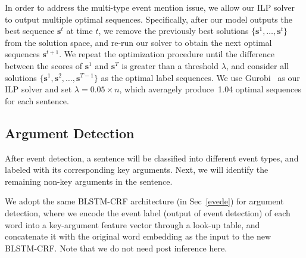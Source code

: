 In order to address the multi-type event mention issue, we allow our ILP solver to output multiple optimal sequences. 
Specifically, after our model outputs the best sequence $\bm{s}^t$ at time $t$, we remove the previously best solutions 
 $\{\bm{s}^1, \ldots, \bm{s}^{t}\}$ from the solution space, and re-run our solver to obtain the next optimal sequences $\bm{s}^{t+1}$. 
We repeat the optimization procedure until the difference between the scores of $\bm{s}^1$ and $\bm{s}^T$ is greater 
than a threshold $\lambda$, and consider all solutions $\{\bm{s}^1, \bm{s}^2, \ldots, \bm{s}^{T-1}\}$ as the optimal label sequences. 
We use Gurobi~\cite{gurobi} as our ILP solver and set $\lambda=0.05 \times n$, which averagely produce~1.04 optimal sequences for each sentence. 

\subsection{Argument Detection}
After event detection, a sentence will be classified into different event types, and labeled with its corresponding key arguments. 
Next, we will identify the remaining non-key arguments in the sentence. 

We adopt the same BLSTM-CRF architecture (in Sec~\ref{evede}) for argument detection, where we encode the event label (output of event detection) of each word into a key-argument feature vector through a look-up table, and concatenate it with the original word embedding as the input to the new BLSTM-CRF. Note that we do not need post inference here.
